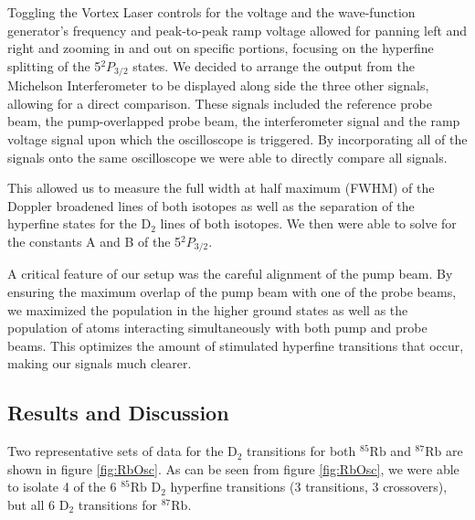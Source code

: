 \documentclass[12pt]{article}
\begin{document}
Toggling the Vortex Laser controls for the voltage and the wave-function generator's frequency and peak-to-peak ramp voltage allowed for panning left and right and zooming in and out on specific portions, focusing on the hyperfine splitting of the 5$^2P_{3/2} $ states.  We decided to arrange the output from the Michelson Interferometer to be displayed along side the three other signals, allowing for a direct comparison. These signals included the reference probe beam, the pump-overlapped probe beam, the interferometer signal and the ramp voltage signal upon which the oscilloscope is triggered.  By incorporating all of the signals onto the same oscilloscope we were able to directly compare all signals.

This allowed us to measure the full width at half maximum (FWHM) of the Doppler broadened lines of both isotopes as well as the separation of the hyperfine states for the D$_2$ lines of both isotopes. We then were able to solve for the constants A and B of the 5$^2 P_{3/2}$.

A critical feature of our setup was the careful alignment of the pump beam.  By ensuring the maximum overlap of the pump beam with one of the probe beams, we maximized the population in the higher ground states as well as the population of atoms interacting simultaneously with both pump and probe beams.  This optimizes the amount of stimulated hyperfine transitions that occur, making our signals much clearer.

\subsection*{Results and Discussion}

Two representative sets of data for the D$_2$ transitions for both ${}^{85}\text{Rb}$ and ${}^{87}\text{Rb}$ are shown in figure \ref{fig:RbOsc}.  As can be seen from figure \ref{fig:RbOsc}, we were able to isolate 4 of the 6 ${}^{85}\text{Rb}$ D$_2$ hyperfine transitions (3 transitions, 3 crossovers), but all 6 D$_2$ transitions for ${}^{87}\text{Rb}$. 
\end{document}
